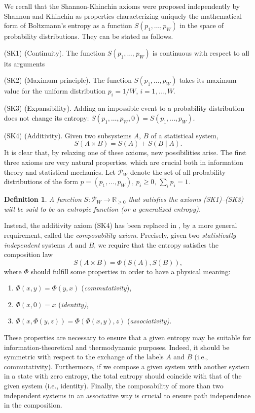 \documentclass[10pt]{amsart}
\newtheorem{definition}{Definition}
\theoremstyle{definition}
\theoremstyle{definition}	 %
\begin{document}
We recall that the Shannon-Khinchin axioms were proposed independently by Shannon and Khinchin as properties characterizing uniquely the mathematical form of Boltzmann's entropy as a function
$S(p_1,\ldots,p_W)$ in the space of probability distributions. They can be stated as follows.

(SK1) (Continuity). The function $S(p_1,\ldots,p_W)$ is continuous with respect to all its arguments

(SK2) (Maximum principle).  The function $S(p_1,\ldots,p_W)$ takes its maximum value for the uniform distribution $p_i=1/W$, $i=1,\ldots,W$.


(SK3) (Expansibility). Adding an impossible event to a probability distribution does not change its entropy: $S(p_1,\ldots,p_W,0)=S(p_1,\ldots,p_W)$.

(SK4) (Additivity). Given two subsystems $A$, $B$ of a statistical system,
\[
S(A \times B)=S(A)+S(B\mid A).
\]
It is clear that, by relaxing one of these axioms, new possibilities arise. The first three axioms are very natural properties, which are crucial both in information theory and statistical mechanics.
 Let $\mathcal{P}_W$ denote the set of all probability distributions of the form $p=(p_1,\ldots,p_W)$, $p_i\geq 0$, $\sum_i p_i =1$.
\begin{definition}
A function $S: \mathcal{P}_W \to \mathbb{R}_{\geq0}$ that satisfies the axioms (SK1)--(SK3) will be said to be an entropic function (or a generalized entropy).
\end{definition}

Instead, the additivity axiom (SK4) has been replaced in \cite{PT2016AOP}, \cite{tempesta2016} by a more general requirement, called the \textit{composability axiom}.
Precisely, given two \textit{statistically independent} systems $A$ and $B$, we require that the entropy satisfies the composition law
\begin{equation}
S(A\times B)= \Phi(S(A), S(B)),
\end{equation}
where $\Phi$ should fulfill some properties in order to have a physical meaning:
\begin{enumerate}
\item \label{C} $\Phi(x,y)=\Phi(y,x)$ ({\it commutativity}),
\item  $\Phi(x,0)=x$ ({\it identity)},
\item  \label{A} $\Phi(x,\Phi(y,z))=\Phi(\Phi(x,y),z)$ ({\it associativity)}.
\end{enumerate}
 These properties are necessary to ensure that a given entropy may be suitable for information-theoretical and
thermodynamic purposes. Indeed, it should be symmetric with respect
to the exchange of the labels $A$ and $B$ (i.e., commutativity). Furthermore, if we compose a given
system with another system in a state with zero entropy, the total entropy should
coincide with that of the given system (i.e., identity). Finally, the composability of more than two
independent systems in an associative way is crucial to ensure path independence in the composition.
\end{document}
